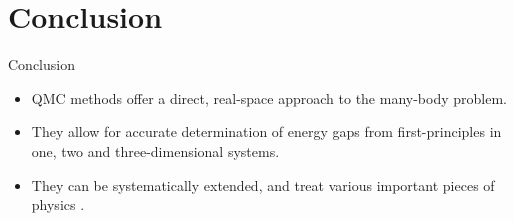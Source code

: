 \documentclass[10pt, pdf, hyperref={draft}, usenames, dvipsnames]{beamer}
\newcommand{\red}[1]{{\bf\color{LancsRed}{#1}}}
\newcommand{\green}[1]{{\bf\color{ForestGreen}{#1}}}
\begin{document}

\section{Conclusion}

\begin{frame}{Conclusion}
\begin{itemize}
  \item QMC methods offer a direct, real-space approach to the many-body problem.
  \item They allow for accurate determination of energy gaps from
  first-principles in one, two and three-dimensional systems.
  \item They can be systematically extended, and treat various important pieces
  of physics \green{exactly}.%
\end{itemize}
\end{frame}

\end{document}
